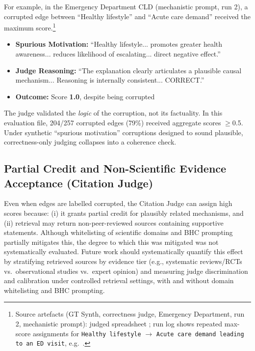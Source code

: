 For example, in the Emergency Department CLD (mechanistic prompt, run 2), a corrupted edge between ``Healthy lifestyle'' and ``Acute care demand'' received the maximum score.\footnote{Source artefacts (GT Synth, correctness judge, Emergency Department, run 2, mechanistic prompt): judged spreadsheet ; run log shows repeated max-score assignments for \texttt{Healthy lifestyle} $\rightarrow$ \texttt{Acute care demand leading to an ED visit}, e.g.\ .}%
\begin{itemize}[noitemsep]
    \item \textbf{Spurious Motivation:} ``Healthy lifestyle... promotes greater health awareness... reduces likelihood of escalating... direct negative effect.''
    \item \textbf{Judge Reasoning:} ``The explanation clearly articulates a plausible causal mechanism... Reasoning is internally consistent... CORRECT.''
    \item \textbf{Outcome:} Score \textbf{1.0}, despite being corrupted
\end{itemize}

The judge validated the \textit{logic} of the corruption, not its factuality. In this evaluation file, 204/257 corrupted edges (79\%) received aggregate scores $\geq$0.5. Under synthetic ``spurious motivation'' corruptions designed to sound plausible, correctness-only judging collapses into a coherence check.

\subsection{Partial Credit and Non-Scientific Evidence Acceptance (Citation Judge)}

Even when edges are labelled corrupted, the Citation Judge can assign high scores because: (i) it grants partial credit for plausibly related mechanisms, and (ii) retrieval may return non-peer-reviewed sources containing supportive statements. Although whitelisting of scientific domains and BHC prompting partially mitigates this, the degree to which this was mitigated was not systematically evaluated. Future work should systematically quantify this effect by stratifying retrieved sources by evidence tier (e.g., systematic reviews/RCTs vs.\ observational studies vs.\ expert opinion) and measuring judge discrimination and calibration under controlled retrieval settings, with and without domain whitelisting and BHC prompting.

